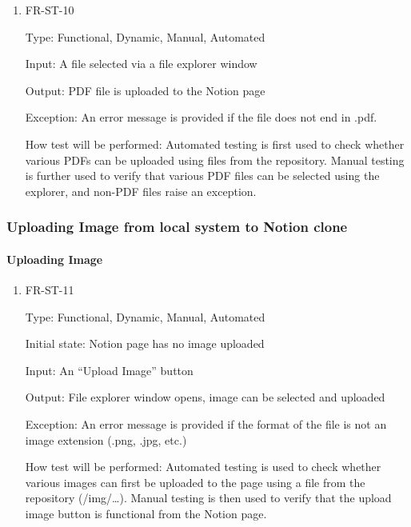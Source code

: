 \documentclass[12pt, titlepage]{article}
\begin{document}
\begin{enumerate}

\item{FR-ST-10\\}

Type: Functional, Dynamic, Manual, Automated 

Input: A file selected via a file explorer window 

Output: PDF file is uploaded to the Notion page 

Exception: An error message is provided if the file does not end in .pdf.  

How test will be performed: Automated testing is first used to check whether various PDFs can be uploaded using files from the repository. Manual testing is further used to verify that various PDF files can be selected using the explorer, and non-PDF files raise an exception. 
\end{enumerate}

\subsubsection{Uploading Image from local system to Notion clone}

\paragraph{Uploading Image}

\begin{enumerate}

\item{FR-ST-11\\}

Type: Functional, Dynamic, Manual, Automated 

Initial state: Notion page has no image uploaded 

Input: An “Upload Image” button 

Output: File explorer window opens, image can be selected and uploaded 

Exception: An error message is provided if the format of the file is not an image extension (.png, .jpg, etc.) 

How test will be performed: Automated testing is used to check whether various images can first be uploaded to the page using a file from the repository (/img/…). Manual testing is then used to verify that the upload image button is functional from the Notion page.

\end{enumerate}
\end{document}
